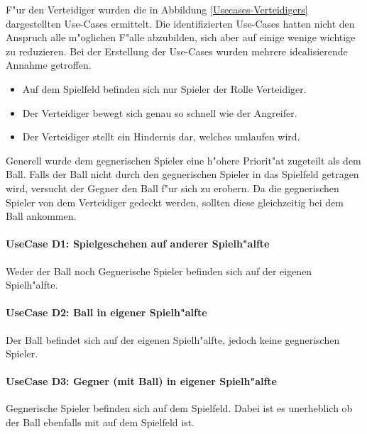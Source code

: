 F"ur den Verteidiger wurden die in Abbildung \ref{Usecases-Verteidigers} dargestellten Use-Cases ermittelt. Die identifizierten Use-Cases hatten nicht den Anspruch alle m"oglichen F"alle abzubilden, sich aber auf einige wenige wichtige zu reduzieren. Bei der Erstellung der Use-Cases wurden mehrere idealisierende Annahme getroffen.

\begin{itemize}
\item Auf dem Spielfeld befinden sich nur Spieler der Rolle Verteidiger.
\item Der Verteidiger bewegt sich genau so schnell wie der Angreifer.
\item Der Verteidiger stellt ein Hindernis dar, welches umlaufen wird.
\end{itemize}

Generell wurde dem gegnerischen Spieler eine h"ohere Priorit"at zugeteilt als dem Ball. Falls der Ball nicht durch den gegnerischen Spieler in das Spielfeld getragen wird, versucht der Gegner den Ball f"ur sich zu erobern. Da die gegnerischen Spieler von dem Verteidiger gedeckt werden, sollten diese gleichzeitig bei dem Ball ankommen.

\paragraph{UseCase D1: Spielgeschehen auf anderer Spielh"alfte}
\label{UseCaseD1}
Weder der Ball noch Gegnerische Spieler befinden sich auf der eigenen Spielh"alfte.
\paragraph{UseCase D2: Ball in eigener Spielh"alfte}
\label{UseCaseD2}
Der Ball befindet sich auf der eigenen Spielh"alfte, jedoch keine gegnerischen Spieler.
\paragraph{UseCase D3: Gegner (mit Ball) in eigener Spielh"alfte}
\label{UseCaseD3}
Gegnerische Spieler befinden sich auf dem Spielfeld. Dabei ist es unerheblich ob der Ball ebenfalls mit auf dem Spielfeld ist.

